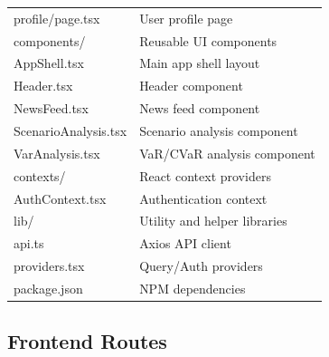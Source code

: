 \begin{longtable}{p{6cm} p{8cm}}
\hspace{1.5cm}profile/page.tsx & User profile page \\
\hspace{1cm}components/ & Reusable UI components \\
\hspace{1.5cm}AppShell.tsx & Main app shell layout \\
\hspace{1.5cm}Header.tsx & Header component \\
\hspace{1.5cm}NewsFeed.tsx & News feed component \\
\hspace{1.5cm}ScenarioAnalysis.tsx & Scenario analysis component \\
\hspace{1.5cm}VarAnalysis.tsx & VaR/CVaR analysis component \\
\hspace{1cm}contexts/ & React context providers \\
\hspace{1.5cm}AuthContext.tsx & Authentication context \\
\hspace{1cm}lib/ & Utility and helper libraries \\
\hspace{1.5cm}api.ts & Axios API client \\
\hspace{1.5cm}providers.tsx & Query/Auth providers \\
\hspace{0.5cm}package.json & NPM dependencies \\
\end{longtable}


\subsection{Frontend Routes}


